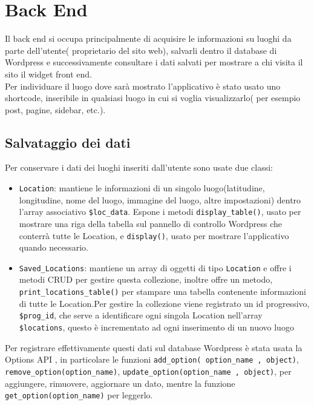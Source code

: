 \section*{Back End}
Il back end si occupa principalmente di acquisire le informazioni su luoghi da parte dell'utente( proprietario del sito web), salvarli dentro il database di Wordpress e successivamente consultare i dati salvati per mostrare a chi visita il sito il widget front end.\\
Per individuare il luogo dove sarà mostrato l'applicativo è stato usato uno shortcode, inseribile in qualsiasi luogo in cui si voglia visualizzarlo( per esempio post, pagine, sidebar, etc.).
\subsection*{Salvataggio dei dati}
Per conservare i dati dei luoghi inseriti dall'utente sono usate due classi:
\begin{itemize}
\item \texttt{Location}: mantiene le informazioni di un singolo luogo(latitudine, longitudine, nome del luogo, immagine del luogo, altre impostazioni) dentro l'array associativo \texttt{\$loc\_data}. 
Espone i metodi \texttt{display\_table()}, usato  per mostrare una riga della tabella sul pannello di controllo Wordpress che conterrà tutte le Location,  e \texttt{display()}, usato per mostrare l'applicativo quando necessario.
\item \texttt{Saved\_Locations}: mantiene un array di oggetti di tipo \texttt{Location} e offre i metodi CRUD per gestire questa collezione, inoltre offre un metodo, \\\texttt{print\_locations\_table()} per stampare una tabella contenente informazioni di tutte le Location.Per gestire la collezione viene registrato un id progressivo, \texttt{\$prog\_id}, che serve a identificare ogni singola Location nell'array \texttt{\$locations}, questo è incrementato ad ogni inserimento di un nuovo luogo
\end{itemize}
Per registrare effettivamente questi dati sul database Wordpress è stata usata la Options API \cite{options}, in particolare le funzioni \texttt{add\_option( option\_name , object)}, \texttt{remove\_option(option\_name)}, \texttt{update\_option(option\_name , object)}, per aggiungere, rimuovere, aggiornare un dato, mentre la funzione \texttt{get\_option(option\_name)} per leggerlo.
